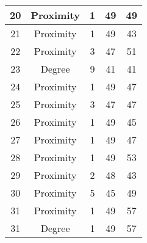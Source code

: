 \documentclass[results.tex]{subfiles}
\begin{document}
\begin{center}
\begin{tabular}{| c || c | c | c | c |}
            \hline
            20                      & Proximity                    & 1                      & 49                      & 49                   \\
            \hline
            21                      & Proximity                    & 1                      & 49                      & 43                   \\
            \hline
            22                      & Proximity                    & 3                      & 47                      & 51                   \\
            \hline
            23                      & Degree                       & 9                      & 41                      & 41                   \\
            \hline
            24                      & Proximity                    & 1                      & 49                      & 47                   \\
            \hline
            25                      & Proximity                    & 3                      & 47                      & 47                   \\
            \hline
            26                      & Proximity                    & 1                      & 49                      & 45                   \\
            \hline
            27                      & Proximity                    & 1                      & 49                      & 47                   \\
            \hline
            28                      & Proximity                    & 1                      & 49                      & 53                   \\
            \hline
            29                      & Proximity                    & 2                      & 48                      & 43                   \\
            \hline
            30                      & Proximity                    & 5                      & 45                      & 49                   \\
            \hline
            31                      & Proximity                    & 1                      & 49                      & 57                   \\
            \hline
            31                      & Degree                       & 1                      & 49                      & 57                   \\

\end{tabular}
\end{center}
\end{document}
